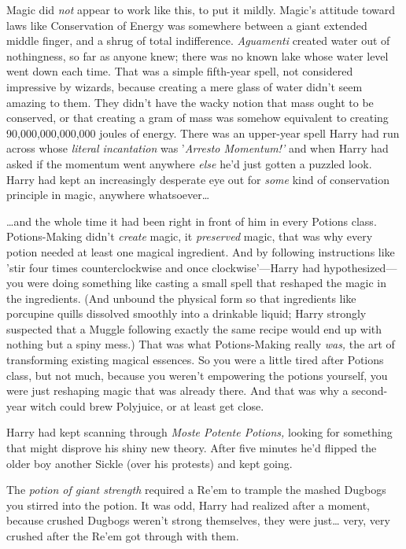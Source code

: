 Magic did \emph{not} appear to work like this, to put it mildly. Magic's 
attitude toward laws like Conservation of Energy was somewhere between a giant 
extended middle finger, and a shrug of total indifference. \emph{Aguamenti} 
created water out of nothingness, so far as anyone knew; there was no known 
lake whose water level went down each time. That was a simple fifth-year spell, 
not considered impressive by wizards, because creating a mere glass of water 
didn't seem amazing to them. They didn't have the wacky notion that mass ought 
to be conserved, or that creating a gram of mass was somehow equivalent to 
creating 90,000,000,000,000 joules of energy. There was an upper-year spell 
Harry had run across whose \emph{literal incantation} was '\emph{Arresto 
Momentum!'} and when Harry had asked if the momentum went anywhere \emph{else} 
he'd just gotten a puzzled look. Harry had kept an increasingly desperate eye 
out for \emph{some} kind of conservation principle in magic, anywhere 
whatsoever{\ldots}

{\ldots}and the whole time it had been right in front of him in every Potions 
class. Potions-Making didn't \emph{create} magic, it \emph{preserved} magic, 
that was why every potion needed at least one magical ingredient. And by 
following instructions like 'stir four times counterclockwise and once 
clockwise'---Harry had hypothesized---you were doing something like casting a 
small spell that reshaped the magic in the ingredients. (And unbound the 
physical form so that ingredients like porcupine quills dissolved smoothly into 
a drinkable liquid; Harry strongly suspected that a Muggle following exactly 
the same recipe would end up with nothing but a spiny mess.) That was what 
Potions-Making really \emph{was,} the art of transforming existing magical 
essences. So you were a little tired after Potions class, but not much, because 
you weren't empowering the potions yourself, you were just reshaping magic that 
was already there. And that was why a second-year witch could brew Polyjuice, 
or at least get close.

Harry had kept scanning through \emph{Moste Potente Potions,} looking for 
something that might disprove his shiny new theory. After five minutes he'd 
flipped the older boy another Sickle (over his protests) and kept going.

The \emph{potion of giant strength} required a Re'em to trample the mashed 
Dugbogs you stirred into the potion. It was odd, Harry had realized after a 
moment, because crushed Dugbogs weren't strong themselves, they were 
just{\ldots} very, very crushed after the Re'em got through with them.

